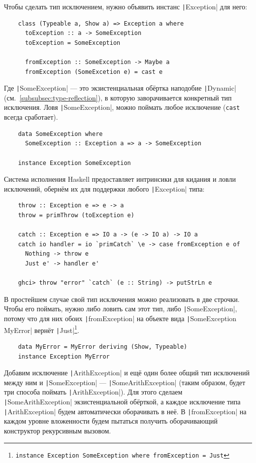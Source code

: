 Чтобы сделать тип исключением, нужно объявить инстанс \texttt|Exception| для него:
\begin{verbatim}
    class (Typeable a, Show a) => Exception a where
      toException :: a -> SomeException
      toException = SomeException

      fromException :: SomeException -> Maybe a
      fromException (SomeExcetion e) = cast e
\end{verbatim}
Где \texttt|SomeException| --- это экзистенциальная обёртка наподобие \texttt|Dynamic| (см.\ \ref{subsubsec:type-reflection}), в которую заворачивается конкретный тип исключения.
Ловя \texttt|SomeException|, можно поймать любое исключение (\texttt{cast} всегда сработает).
\begin{verbatim}
    data SomeException where
      SomeException :: Exception a => a -> SomeException

    instance Exception SomeException
\end{verbatim}

Система исполнения Haskell предоставляет интринсики для кидания и ловли исключений, обернём их для поддержки любого \texttt|Exception| типа:
\begin{verbatim}
    throw :: Exception e => e -> a
    throw = primThrow (toException e)

    catch :: Exception e => IO a -> (e -> IO a) -> IO a
    catch io handler = io `primCatch` \e -> case fromException e of
      Nothing -> throw e
      Just e' -> handler e'

    ghci> throw "error" `catch` (e :: String) -> putStrLn e
\end{verbatim}

В простейшем случае свой тип исключения можно реализовать в две строчки.
Чтобы его поймать, нужно либо ловить сам этот тип, либо \texttt|SomeException|, потому что для них обоих \texttt|fromException| на объекте вида \texttt|SomeException MyError| вернёт \texttt|Just|\footnote{\texttt{instance Exception SomeException where fromException = Just}}.
\begin{verbatim}
    data MyError = MyError deriving (Show, Typeable)
    instance Exception MyError
\end{verbatim}

Добавим исключение \texttt|ArithException| и ещё один более общий тип исключений между ним и \texttt|SomeException| --- \texttt|SomeArithException| (таким образом, будет три способа поймать \texttt|ArithException|).
Для этого сделаем \texttt|SomeArithException| экзистенциальной обёрткой, а каждое исключение типа \texttt|ArithException| будем автоматически оборачивать в неё.
В \texttt|fromException| на каждом уровне вложенности будем пытаться получить оборачивающий конструктор рекурсивным вызовом.


